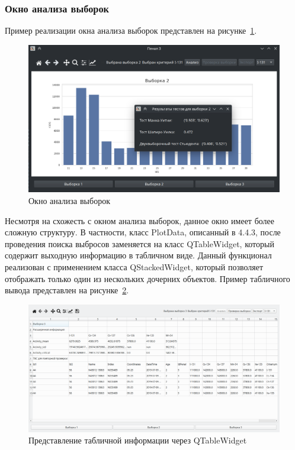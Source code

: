 \subsubsection{Окно анализа выборок}

Пример реализации окна анализа выборок представлен на рисунке~\ref{fig:ris10}.

\begin{figure}[H]
	\centering
	\includegraphics[width=1\linewidth]{pics/ris10} %
	\caption{Окно анализа выборок}
	\label{fig:ris10} %
\end{figure}

Несмотря на схожесть с окном анализа выборок, данное окно имеет более сложную структуру. В частности, класс PlotData, описанный в 4.4.3, после проведения поиска выбросов заменяется на класс QTableWidget, который содержит выходную информацию в табличном виде. Данный функционал реализован с применением класса QStackedWidget, который позволяет отображать только один из нескольких дочерних объектов. Пример табличного вывода представлен на рисунке~\ref{fig:ris14}.

\begin{figure}[H]
	\centering
	\includegraphics[width=1\linewidth]{pics/ris14} %
	\caption{Представление табличной информации через QTableWidget}
	\label{fig:ris14} %
\end{figure}

